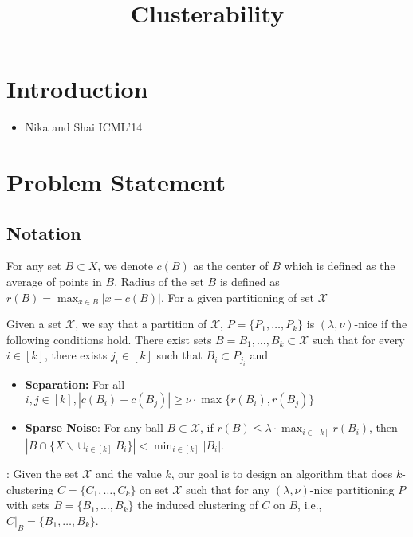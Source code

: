 \documentclass[11pt]{article}
\title{\LARGE Clusterability}
\author{}
\begin{document}
\maketitle

\section{Introduction}
\begin{itemize}
\item Nika and Shai ICML'14
\end{itemize}

\section{Problem Statement}

\subsection{Notation}
For any set $B\subset X$, we denote $c(B)$ as the center of $B$ which is defined as the average of points in $B$. Radius of the set $B$ is defined as $r(B)=\max_{x\in B} |x-c(B)|$. For a given partitioning of set $\mathcal{X}$

\begin{definition}
Given a set $\mathcal{X}$, we say that a partition of $\mathcal{X}$, $P=\{P_1,\ldots,P_k\}$ is $(\lambda,\nu)$-nice if the following conditions hold. There exist sets $B=B_1,\ldots,B_k\subset \mathcal{X}$ such that for every $i\in[k]$, there exists $j_i\in[k]$ such that $B_i\subset P_{j_i}$ and
\begin{itemize}
\item{\bf{Separation}:} For all $i,j\in[k], |c(B_i)-c(B_j)|\geq \nu\cdot\max\{r(B_i),r(B_j)\}$
\item{\bf{Sparse Noise}}: For any ball $B\subset \mathcal{X}$, if $r(B)\leq \lambda \cdot \max_{i\in[k]} r(B_i)$, then $|B\cap \{X \backslash \cup_{i\in[k]} B_i\}| < \min_{i\in[k]}|B_i|$.
\end{itemize}
\end{definition}

: Given the set $\mathcal{X}$ and the value $k$, our goal is to design an algorithm that does $k$-clustering $C=\{C_1,\ldots,C_k\}$ on set $\mathcal{X}$ such that  for any $(\lambda,\nu)$-nice partitioning $P$ with sets $B = \{B_1,\ldots,B_k\}$ the induced clustering of $C$ on $B$, i.e., $C|_B = \{B_1,\ldots,B_k\}$. 
\end{document}
